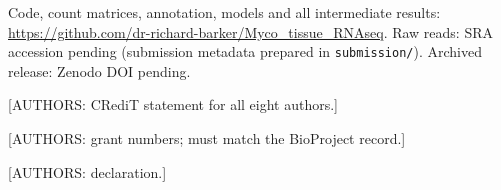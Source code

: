 \documentclass[sn-nature,pdflatex,lineno]{sn-jnl}
\begin{document}

\maketitle



\backmatter

Code, count matrices, annotation, models and all intermediate results:
\url{https://github.com/dr-richard-barker/Myco_tissue_RNAseq}. Raw reads: SRA accession
pending (submission metadata prepared in \texttt{submission/}). Archived release: Zenodo DOI
pending.

 [AUTHORS: CRediT statement for all eight authors.]

 [AUTHORS: grant numbers; must match the BioProject record.]

 [AUTHORS: declaration.]


\end{document}
